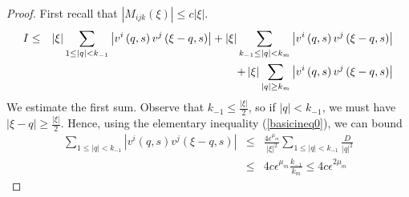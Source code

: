 \documentclass{amsart}
\begin{document}
\begin{proof}
First recall that $\left|M_{ijk}\left(\xi\right)\right|\leq c\left|\xi\right|$.
\begin{eqnarray}
\label{firstineq}
I&\leq& 
\left|\xi\right|\sum_{1\leq\left|q\right|<k_{-1}}\left|v^i\left(q,s\right)v^j\left(\xi-q,s\right)\right|+
\left|\xi\right|\sum_{k_{-1}\leq\left|q\right|< k_m}\left|v^i\left(q,s\right)v^j\left(\xi-q,s\right)\right|\\ \notag
&&+
\left|\xi\right|\sum_{\left|q\right|\geq  k_m}\left|v^i\left(q,s\right)v^j\left(\xi-q,s\right)\right|
\end{eqnarray}
We estimate the first sum. Observe that $k_{-1}\leq \frac{\left|\xi\right|}{2}$, so if $\left|q\right|<k_{-1}$,
we must have $\left|\xi-q\right|\geq \frac{\left|\xi\right|}{2}$. Hence, using the elementary inequality
(\ref{basicineq0}), we can bound
\begin{eqnarray*}
\sum_{1\leq\left|q\right|<k_{-1}}\left|v^i\left(q,s\right)v^j\left(\xi-q,s\right)\right|
&\leq&
\frac{4\epsilon^{\mu_m}}{\left|\xi\right|^2}\sum_{1\leq\left|q\right|<k_{-1}}\frac{D}{\left|q\right|^2}\\
&\leq& 4c\epsilon^{\mu_m}\frac{k_{-1}}{k_m}\leq 4c\epsilon^{2\mu_m}
\end{eqnarray*}


\end{proof}
\end{document}
